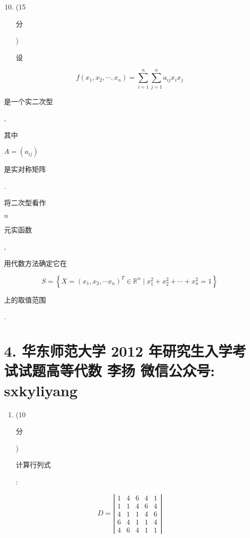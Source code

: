 \documentclass[10pt]{article}
\begin{document}
\begin{enumerate}
  \setcounter{enumi}{9}
  \item (15 \begin{CJK}{UTF8}{mj}分\end{CJK}) \begin{CJK}{UTF8}{mj}设\end{CJK}
\end{enumerate}
$$
f\left(x_{1}, x_{2}, \cdots, x_{n}\right)=\sum_{i=1}^{n} \sum_{j=1}^{n} a_{i j} x_{i} x_{j}
$$
\begin{CJK}{UTF8}{mj}是一个实二次型\end{CJK}, \begin{CJK}{UTF8}{mj}其中\end{CJK} $A=\left(a_{i j}\right)$ \begin{CJK}{UTF8}{mj}是实对称矩阵\end{CJK}. \begin{CJK}{UTF8}{mj}将二次型看作\end{CJK} $n$ \begin{CJK}{UTF8}{mj}元实函数\end{CJK}, \begin{CJK}{UTF8}{mj}用代数方法确定它在\end{CJK}
$$
S=\left\{X=\left(x_{1}, x_{2}, \cdots x_{n}\right)^{T} \in \mathbb{R}^{n} \mid x_{1}^{2}+x_{2}^{2}+\cdots+x_{n}^{2}=1\right\}
$$
\begin{CJK}{UTF8}{mj}上的取值范围\end{CJK}.

\section{4. 华东师范大学 2012 年研究生入学考试试题高等代数 
 李扬 
 微信公众号: sxkyliyang}
\begin{enumerate}
  \item (10 \begin{CJK}{UTF8}{mj}分\end{CJK}) \begin{CJK}{UTF8}{mj}计算行列式\end{CJK}:
\end{enumerate}
$$
D=\left|\begin{array}{lllll}
1 & 4 & 6 & 4 & 1 \\
1 & 1 & 4 & 6 & 4 \\
4 & 1 & 1 & 4 & 6 \\
6 & 4 & 1 & 1 & 4 \\
4 & 6 & 4 & 1 & 1
\end{array}\right|
$$
\end{document}
